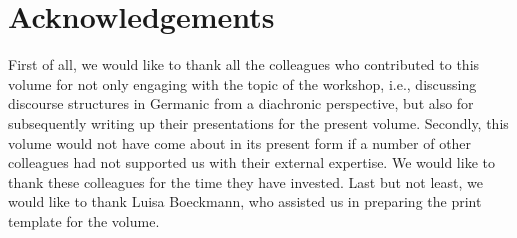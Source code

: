 \documentclass[output=paper,colorlinks,citecolor=brown]{langscibook}
\begin{document}
\section*{Acknowledgements}
First of all, we would like to thank all the colleagues who contributed to this volume for not only engaging with the topic of the workshop, i.e., discussing discourse structures in Germanic from a diachronic perspective, but also for subsequently writing up their presentations for the present volume. Secondly, this volume would not have come about in its present form if a number of other colleagues had not supported us with their external expertise. We would like to thank these colleagues for the time they have invested. Last but not least, we would like to thank Luisa Boeckmann, who assisted us in preparing the print template for the volume.  

{\sloppy\printbibliography[heading=subbibliography,notkeyword=this]}

\end{document}
